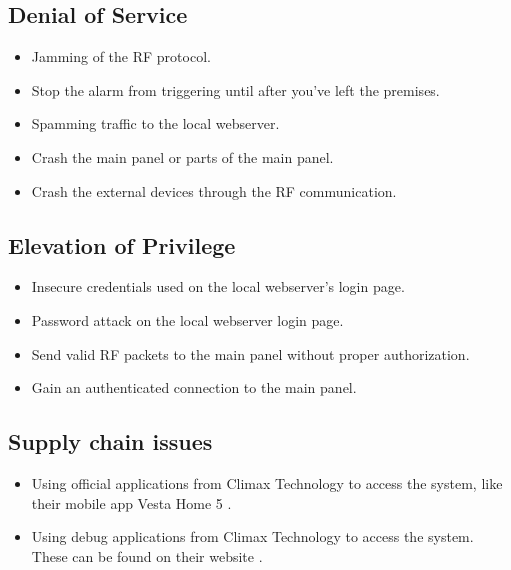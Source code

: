 \subsection{Denial of Service}
\begin{itemize}
    \item Jamming of the RF protocol.
    \item Stop the alarm from triggering until after you've left the premises.
    \item Spamming traffic to the local webserver.
    \item Crash the main panel or parts of the main panel.
    \item Crash the external devices through the RF communication.
\end{itemize}

\subsection{Elevation of Privilege}
\begin{itemize}
    \item Insecure credentials used on the local webserver's login page.
    \item Password attack on the local webserver login page.
    \item Send valid RF packets to the main panel without proper authorization.
    \item Gain an authenticated connection to the main panel.
\end{itemize}

\subsection{Supply chain issues}
\begin{itemize}
    \item Using official applications from Climax Technology to access the system, like their mobile app Vesta Home 5 .
    \item Using debug applications from Climax Technology to access the system. These can be found on their website .
\end{itemize}
